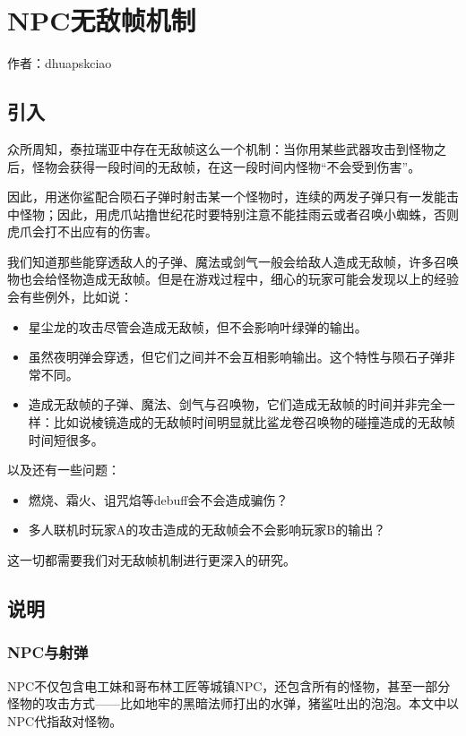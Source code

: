 \chapter{NPC无敌帧机制}
\begin{center}
作者：dhuapskciao
\end{center}
\section{引入}
众所周知，泰拉瑞亚中存在无敌帧这么一个机制：当你用某些武器攻击到怪物之后，怪物会获得一段时间的无敌帧，在这一段时间内怪物“不会受到伤害”。

因此，用迷你鲨配合陨石子弹时射击某一个怪物时，连续的两发子弹只有一发能击中怪物；因此，用虎爪站撸世纪花时要特别注意不能挂雨云或者召唤小蜘蛛，否则虎爪会打不出应有的伤害。

我们知道那些能穿透敌人的子弹、魔法或剑气一般会给敌人造成无敌帧，许多召唤物也会给怪物造成无敌帧。但是在游戏过程中，细心的玩家可能会发现以上的经验会有些例外，比如说：
\begin{itemize}
\item 星尘龙的攻击尽管会造成无敌帧，但不会影响叶绿弹的输出。
\item 虽然夜明弹会穿透，但它们之间并不会互相影响输出。这个特性与陨石子弹非常不同。
\item 造成无敌帧的子弹、魔法、剑气与召唤物，它们造成无敌帧的时间并非完全一样：比如说棱镜造成的无敌帧时间明显就比鲨龙卷召唤物的碰撞造成的无敌帧时间短很多。
\end{itemize}

以及还有一些问题：
\begin{itemize}
\item 燃烧、霜火、诅咒焰等debuff会不会造成骗伤？
\item 多人联机时玩家A的攻击造成的无敌帧会不会影响玩家B的输出？
\end{itemize}

这一切都需要我们对无敌帧机制进行更深入的研究。

\section{说明}
\subsection{NPC与射弹}
NPC不仅包含电工妹和哥布林工匠等城镇NPC，还包含所有的怪物，甚至一部分怪物的攻击方式——比如地牢的黑暗法师打出的水弹，猪鲨吐出的泡泡。本文中以NPC代指敌对怪物。

